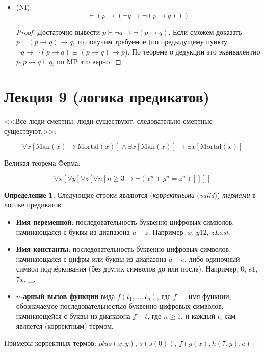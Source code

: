 \documentclass[12pt]{article}
\let\im\rightarrow
\let\eq\equiv
\let\n\neg
\theoremstyle{definition}
\newtheorem{definition}{Определение}[section]
\theoremstyle{plain}
\theoremstyle{remark}
\begin{document}
\begin{itemize}
  \item (NI):
    \[
      \vdash (p \im (\n q \im \n(p \im q)))
    \]
    \begin{proof}
      Достаточно вывести $p \vdash \n q \im \n (p \im q)$. Если
      сможем доказать $p \vdash (p \im q) \im q$, то получим
      требуемое (по предыдущему пункту $\n q \im \n(p \im q) \eq (p
      \im q) \im p$). По теореме о дедукции это эквивалентно $p, p
      \im q \vdash q$, по MP это верно.
    \end{proof}
\end{itemize}

\pagebreak

\section{Лекция 9 (логика предикатов)}

<<Все люди смертны, люди существуют, следовательно смертные существуют.>>:

\[
  \forall x [\mathrm{Man}(x) \im \mathrm{Mortal}(x)] \land \exists x
  [\mathrm{Man}(x)] \im \exists x [\mathrm{Mortal}(x)]
\]

Великая теорема Ферма:

\[
  \forall x [\forall y [\forall z [\forall n [n \geqslant 3 \im \n
  (x^n + y^n = z^n)]]]]
\]

\begin{definition}
  Следующие строки являются (\textit{корректными} (\textit{valid}))
  \textit{термами} в логике предикатов:
  \begin{itemize}
    \item \textbf{Имя переменной}: последовательность
      буквенно-цифровых символов, начинающаяся с буквы из диапазона
      $u-z$. Например, $x$, $y12$, $zLast$.

    \item \textbf{Имя константы}: последовательность
      буквенно-цифровых символов, начинающаяся с цифры или буквы из
      диапазона $a-e$, либо одиночный символ подчёркивания (без
      других символов до или после). Например, $0$, $e1$, $7x$, \_.

    \item \textbf{$n$-арный вызов функции} вида $f(t_1, \dots, t_n)$,
      где $f$ --- имя функции, обозначаемое последовательностью
      буквенно-цифровых символов, начинающейся с буквы из диапазона
      $f-t$, где $n \geqslant 1$, и каждый $t_i$ сам является
      (корректным) термом.
  \end{itemize}

  Примеры корректных термов: $plus(x, y)$, $s(s(0))$, $f(g(x), h(7, y), c)$.
\end{definition}
\end{document}
